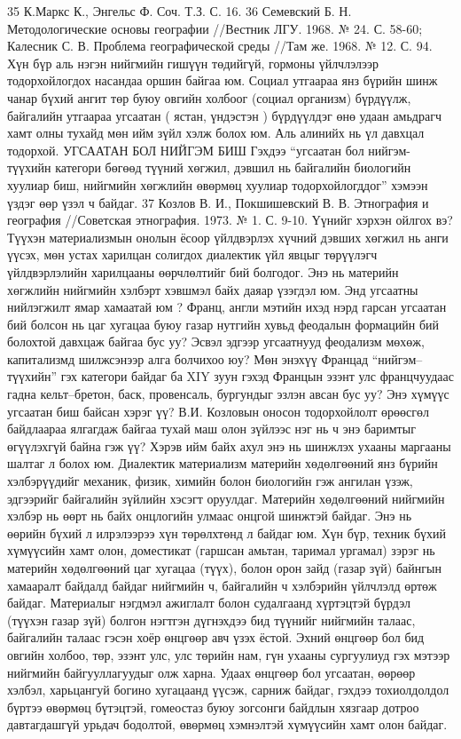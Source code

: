 35 К.Маркс К., Энгельс Ф. Соч. Т.З. С. 16. 36 Семевский Б. Н. Методологические основы географии //Вестник ЛГУ. 1968. № 24. С. 58-60; Калесник С. В. Проблема географической среды //Там же. 1968. № 12. С. 94.
Хүн бүр аль нэгэн нийгмийн гишүүн төдийгүй, гормоны үйлчлэлээр тодорхойлогдох насандаа оршин байгаа юм. Социал утгаараа янз бүрийн шинж чанар бүхий ангит төр буюу овгийн холбоог (социал организм) бүрдүүлж, байгалийн утгаараа угсаатан ( ястан, үндэстэн ) бүрдүүлдэг өнө удаан амьдрагч хамт олны тухайд мөн ийм зүйл хэлж болох юм. Аль алинийх нь үл давхцал тодорхой.
УГСААТАН БОЛ НИЙГЭМ БИШ
Гэхдээ “угсаатан бол нийгэм-түүхийн категори бөгөөд түүний хөгжил, дэвшил нь байгалийн биологийн хуулиар биш, нийгмийн хөгжлийн өвөрмөц хуулиар тодорхойлогддог” хэмээн үздэг өөр үзэл ч байдаг.
37 Козлов В. И., Покшишевский В. В. Этнография и география //Советская этнография. 1973. № 1. С. 9-10.
Үүнийг хэрхэн ойлгох вэ? Түүхэн материализмын онолын ёсоор үйлдвэрлэх хүчний дэвших хөгжил нь анги үүсэх, мөн устах харилцан солигдох диалектик үйл явцыг төрүүлэгч үйлдвэрлэлийн харилцааны өөрчлөлтийг бий болгодог. Энэ нь материйн хөгжлийн нийгмийн хэлбэрт хэвшмэл байх даяар үзэгдэл юм. Энд угсаатны нийлэгжилт ямар хамаатай юм ? Франц, англи мэтийн ихэд нэрд гарсан угсаатан бий болсон нь цаг хугацаа буюу газар нутгийн хувьд феодалын формацийн бий болохтой давхцаж байгаа бус уу? Эсвэл эдгээр угсаатнууд феодализм мөхөж, капитализмд шилжсэнээр алга болчихоо юу? Мөн энэхүү Францад “нийгэм–түүхийн” гэх категори байдаг ба XIY зуун гэхэд Францын эзэнт улс францчуудаас гадна кельт–бретон, баск, провенсаль, бургундыг эзлэн авсан бус уу? Энэ хүмүүс угсаатан биш байсан хэрэг үү? В.И. Козловын оносон тодорхойлолт өрөөсгөл байдлаараа ялгагдаж байгаа тухай маш олон зүйлээс нэг нь ч энэ баримтыг өгүүлэхгүй байна гэж үү? Хэрэв ийм байх ахул энэ нь шинжлэх ухааны маргааны шалтаг л болох юм.
Диалектик материализм материйн хөдөлгөөний янз бүрийн хэлбэрүүдийг механик, физик, химийн болон биологийн гэж ангилан үзэж, эдгээрийг байгалийн зүйлийн хэсэгт оруулдаг. Материйн хөдөлгөөний нийгмийн хэлбэр нь өөрт нь байх онцлогийн улмаас онцгой шинжтэй байдаг. Энэ нь өөрийн бүхий л илрэлээрээ хүн төрөлхтөнд л байдаг юм. Хүн бүр, техник бүхий хүмүүсийн хамт олон, доместикат (гаршсан амьтан, таримал ургамал) зэрэг нь материйн хөдөлгөөний цаг хугацаа (түүх), болон орон зайд (газар зүй) байнгын хамааралт байдалд байдаг нийгмийн ч, байгалийн ч хэлбэрийн үйлчлэлд өртөж байдаг. Материалыг нэгдмэл ажиглалт болон судалгаанд хүртэцтэй бүрдэл (түүхэн газар зүй) болгон нэгтгэн дүгнэхдээ бид түүнийг нийгмийн талаас, байгалийн талаас гэсэн хоёр өнцгөөр авч үзэх ёстой. Эхний өнцгөөр бол бид овгийн холбоо, төр, эзэнт улс, улс төрийн нам, гүн ухааны сургуулиуд гэх мэтээр нийгмийн байгууллагуудыг олж харна. Удаах өнцгөөр бол угсаатан, өөрөөр хэлбэл, харьцангуй богино хугацаанд үүсэж, сарниж байдаг, гэхдээ тохиолдолдол бүртээ өвөрмөц бүтэцтэй, гомеостаз буюу зогсонги байдлын хязгаар дотроо давтагдашгүй урьдач бодолтой, өвөрмөц хэмнэлтэй хүмүүсийн хамт олон байдаг.
